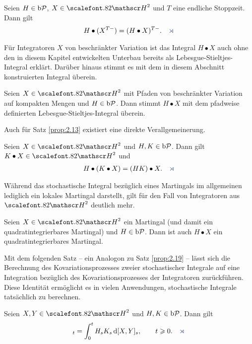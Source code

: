 \begin{korollar}
\label{cor:4.2}
Seien $H \in \mathrm{b}\mathcal{P}$, $X \in \cH^2$ und $T$ eine endliche Stoppzeit. Dann gilt
\begin{align*}
H \bullet (X^{T-}) = (H \bullet X)^{T-}.\fish
\end{align*}
\end{korollar}

Für Integratoren $X$ von beschränkter Variation ist das Integral $H\bullet X$
auch ohne den in diesem Kapitel entwickelten Unterbau bereits als
Lebesgue-Stieltjes-Integral erklärt. Darüber hinaus stimmt es mit dem in diesem
Abschnitt konstruierten Integral überein.

\begin{theorem}
\label{prop:4.9}
Seien $X \in \cH^2$ mit Pfaden von beschränkter Variation auf kompakten
 Mengen und $H \in \mathrm{b}\mathcal{P}$. Dann stimmt $H \bullet X$ mit dem pfadweise
  definierten Lebesgue-Stieltjes-Integral überein.\fish
\end{theorem}

Auch für Satz \ref{prop:2.13} existiert eine direkte Verallgemeinerung.

\begin{theorem}[Assoziativität]
\label{prop:4.10}
Seien $X \in \cH^2$ und $H,K \in \mathrm{b}\mathcal{P}$. Dann gilt $ K \bullet X \in \cH^2$ und
\begin{align*}
  H \bullet (K \bullet X) = (HK) \bullet X.\fish
\end{align*}  
\end{theorem}

Während das stochastische Integral bezüglich eines Martingals im allgemeinen
lediglich ein lokales Martingal darstellt, gilt für den Fall von Integratoren
aus $\HH^2$ deutlich mehr.

\begin{theorem}
\label{prop:4.11}
  Seien $X\in \cH^2$ ein Martingal (und damit ein quadratintegrierbares
  Martingal) und $H \in  \mathrm{b}\mathcal{P}$. Dann ist auch $H \bullet X$ ein
  quadratintegrierbares Martingal.\fish
\end{theorem}

Mit dem folgenden Satz -- ein Analogon zu Satz \ref{prop:2.19} -- lässt
sich die Berechnung des Kovariationsprozesses zweier stochastischer Integrale
auf eine Integration bezüglich des Kovariationsprozesses der Integratoren
zurückführen. Diese Identität ermöglicht es in vielen Anwendungen, stochastische
Integrale tatsächlich zu berechnen.

\begin{theorem}
\label{itoident}
Seien $X,Y \in \cH^2$ und $H,K \in \mathrm{b}\mathcal{P}$. Dann gilt
\begin{align*}
[H \bullet X, K \bullet Y]_t  = \int_0^t H_sK_s\,\diffd[X,Y]_s,\qquad t\ge
0.\fish
\end{align*}
\end{theorem}


